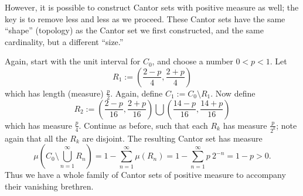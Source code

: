 \documentclass[12pt]{article}
\newcommand{\defined}{:=}
\begin{document}
However, it is possible to construct Cantor sets with positive 
measure as well; the key is to remove less and less as we proceed.  These Cantor sets have the same ``shape'' (topology) as the 
Cantor set we first constructed, and the same cardinality, but a different ``size.''

Again, start with the unit interval for $C_0$, and choose a number $0 < p < 1$.  Let
\begin{equation}
R_1 \defined \left(\frac{2-p}{4},\frac{2+p}{4}\right)
\end{equation}
which has length (measure) $\frac{p}{2}$.  Again, define $C_1 \defined C_0 \setminus R_1$.  Now define
\begin{equation}
R_2 \defined \left(\frac{2-p}{16},\frac{2+p}{16}\right) \bigcup \left(\frac{14-p}{16},\frac{14+p}{16}\right)
\end{equation}
which has measure $\frac{p}{4}$.  Continue as before, such that each $R_k$ has measure $\frac{p}{2^k}$; note again that all the 
$R_k$ are disjoint.  The resulting Cantor set has measure
\begin{equation*}
\mu\left(C_0 \setminus \bigcup_{n=1}^{\infty}R_n \right) = 1 - \sum_{n=1}^{\infty} \mu(R_n) = 1 - \sum_{n=1}^{\infty} p\ 2^{-n} = 1-p > 0.
\end{equation*}
Thus we have a whole family of Cantor sets of positive measure to accompany their vanishing brethren.

\end{document}
